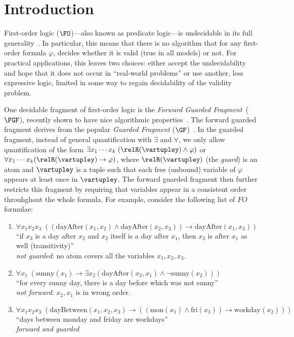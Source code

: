 \chapter{Introduction}\label{chap:introduction}

First-order logic ($\FO$)---also known as predicate logic---is undecidable in its full generality~\cite[Sec. 1.1]{borger1997}.
In particular, this means that there is no algorithm that for any first-order formula $\varphi$, decides whether it is valid (true in all models) or not.
For practical applications, this leaves two choices: either accept the undecidability and hope that it does not occur in ``real-world problems'' or use another, less expressive logic, limited in some way to regain decidability of the validity problem.

One decidable fragment of first-order logic is the \emph{Forward Guarded Fragment}~($\FGF$), recently shown to have nice algorithmic properties~\cite{Bednarczyk21}.
The forward guarded fragment derives from the popular \emph{Guarded Fragment} ($\GF$)~\cite{AndrekaNB98}.
In the guarded fragment, instead of general quantification with $\exists$ and $\forall$, we only allow quantification of the form $\exists{x_{1}\cdots{}x_{k}}\; (\relR(\vartupley) \land \varphi)$ or $\forall{x_{1}\cdots{}x_{k}} (\relR(\vartupley) \to \varphi)$, where $\relR(\vartupley)$ (the \emph{guard}) is an atom and $\vartupley$ is a tuple such that each free (unbound) variable of $\varphi$ appears at least once in $\vartupley$.
The forward guarded fragment then further restricts this fragment by requiring that variables appear in a consistent order throuhghout the whole formula.
For example, consider the following list of $FO$ formulae:
\begin{enumerate}
  \item $\forall{x_{1}x_{2}x_{3}}\; ((\mathrm{dayAfter}(x_{1},x_{2}) \land \mathrm{dayAfter}(x_{2},x_{3})) \to \mathrm{dayAfter}(x_{1}, x_{3}))$ \\
        ``if $x_{3}$ is a day after $x_{2}$ and $x_{2}$ itself is a day after $x_{1}$, then $x_{3}$ is after $x_{1}$ as well (transitivity)'' \\
        \emph{not guarded}: no atom covers all the variables $x_{1}, x_{2}, x_{3}$.
  \item $\forall{x_{1}}\; (\mathrm{sunny}(x_{1}) \to \exists{x_{2}} (\mathrm{dayAfter}(x_{2},x_{1}) \land \neg \mathrm{sunny}(x_{2})))$ \\
        ``for every sunny day, there is a day before which was not sunny'' \\
        \emph{not forward}: $x_{2}, x_{1}$ is in wrong order.
  \item $\forall{x_{1}x_{2}x_{3}}\; (\mathrm{dayBetween}(x_{1},x_{2},x_{3}) \to ((\mathrm{mon}(x_{1}) \land \mathrm{fri}(x_{3})) \to \mathrm{workday}(x_{2})))$ \\
        ``days between monday and friday are workdays'' \\
        \emph{forward and guarded}
\end{enumerate}

